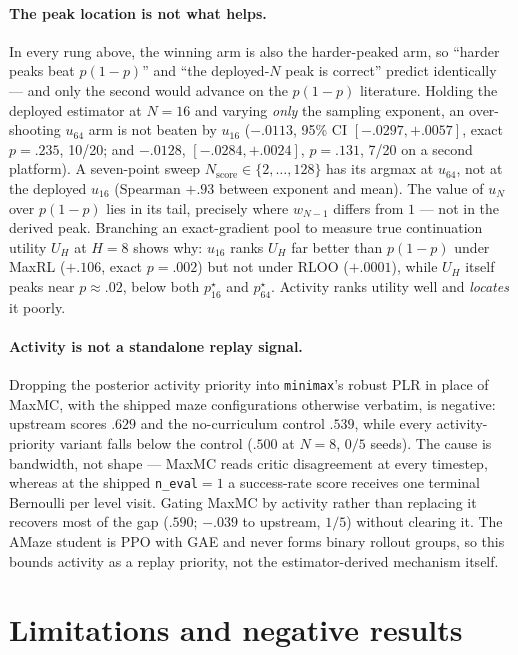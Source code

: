 \paragraph{The peak location is not what helps.} In every rung above, the
winning arm is also the harder-peaked arm, so ``harder peaks beat $p(1-p)$''
and ``the deployed-$N$ peak is correct'' predict identically --- and only the
second would advance on the $p(1-p)$ literature. Holding the deployed
estimator at $N=16$ and varying \emph{only} the sampling exponent, an
over-shooting $u_{64}$ arm is not beaten by $u_{16}$ ($-.0113$, 95\% CI
$[-.0297,+.0057]$, exact $p=.235$, 10/20; and $-.0128$,
$[-.0284,+.0024]$, $p=.131$, 7/20 on a second platform). A seven-point sweep
$N_{\text{score}}\in\{2,\dots,128\}$ has its argmax at $u_{64}$, not at the
deployed $u_{16}$ (Spearman $+.93$ between exponent and mean). The value of
$u_N$ over $p(1-p)$ lies in its tail, precisely where $w_{N-1}$ differs from
$1$ --- not in the derived peak. Branching an exact-gradient pool to measure
true continuation utility $U_H$ at $H=8$ shows why: $u_{16}$ ranks $U_H$ far
better than $p(1-p)$ under MaxRL ($+.106$, exact $p=.002$) but not under RLOO
($+.0001$), while $U_H$ itself peaks near $p\approx.02$, below both
$p^\star_{16}$ and $p^\star_{64}$. Activity ranks utility well and
\emph{locates} it poorly.

\paragraph{Activity is not a standalone replay signal.} Dropping the
posterior activity priority into \texttt{minimax}'s robust PLR in place of
MaxMC, with the shipped maze configurations otherwise verbatim, is negative:
upstream scores $.629$ and the no-curriculum control $.539$, while every
activity-priority variant falls below the control ($.500$ at $N{=}8$, $0/5$
seeds). The cause is bandwidth, not shape --- MaxMC reads critic disagreement
at every timestep, whereas at the shipped \texttt{n\_eval}${=}1$ a
success-rate score receives one terminal Bernoulli per level visit. Gating
MaxMC by activity rather than replacing it recovers most of the gap ($.590$;
$-.039$ to upstream, $1/5$) without clearing it. The AMaze student is PPO with
GAE and never forms binary rollout groups, so this bounds activity as a replay
priority, not the estimator-derived mechanism itself.

\section{Limitations and negative results}\label{sec:limits}

